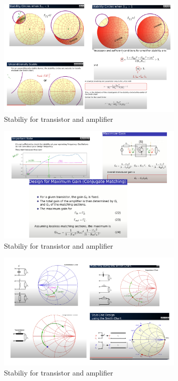 \documentclass{article}
\begin{document}
\begin{itemize}
    \begin{figure}[H]
        \centering
        \includegraphics[width=0.8\textwidth]{figures/stability 7.pdf}
        \caption{Stabiliy for transistor and amplifier}
        \label{stability5}
    \end{figure}


    \begin{figure}[H]
        \centering
        \includegraphics[width=0.8\textwidth]{figures/stability 8.pdf}
        \caption{Stabiliy for transistor and amplifier}
        \label{stability5}
    \end{figure}

    \begin{figure}[H]
        \centering
        \includegraphics[width=0.8\textwidth]{figures/stability 9.pdf}
        \caption{Stabiliy for transistor and amplifier}
        \label{stability5}
    \end{figure}


\end{itemize}
\end{document}
